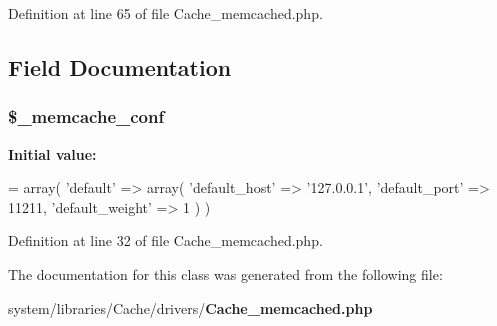 Definition at line 65 of file Cache\-\_\-memcached.\-php.



\subsection{Field Documentation}
\subsubsection[{\$\-\_\-memcache\-\_\-conf}]{\setlength{\rightskip}{0pt plus 5cm}\$\-\_\-memcache\-\_\-conf\hspace{0.3cm}{\ttfamily [protected]}}\label{class_c_i___cache__memcached_a31577b029b5c3ce5002b0d30ac01b261}
{\bfseries Initial value\-:}
\begin{DoxyCode}
= array(
                    \textcolor{stringliteral}{'default'} => array(
                        \textcolor{stringliteral}{'default\_host'}      => \textcolor{stringliteral}{'127.0.0.1'},
                        \textcolor{stringliteral}{'default\_port'}      => 11211,
                        \textcolor{stringliteral}{'default\_weight'}    => 1
                    )
                )
\end{DoxyCode}


Definition at line 32 of file Cache\-\_\-memcached.\-php.



The documentation for this class was generated from the following file\-:\begin{DoxyCompactItemize}
\item 
system/libraries/\-Cache/drivers/{\bf Cache\-\_\-memcached.\-php}\end{DoxyCompactItemize}
